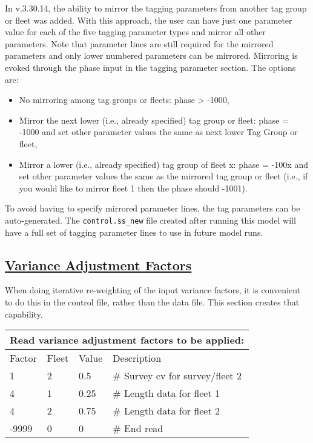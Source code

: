 In v.3.30.14, the ability to mirror the tagging parameters from another tag group or fleet was added. With this approach, the user can have just one parameter value for each of the five tagging parameter types and mirror all other parameters. Note that parameter lines are still required for the mirrored parameters and only lower numbered parameters can be mirrored. Mirroring is evoked through the phase input in the tagging parameter section. The options are:
\begin{itemize}
	\item No mirroring among tag groups or fleets: phase > -1000,
	\item Mirror the next lower (i.e., already specified) tag group or fleet: phase = -1000 and set other parameter values the same as next lower Tag Group or fleet,
	\item Mirror a lower (i.e., already specified) tag group of fleet x: phase = -100x and set other parameter values the same as the mirrored tag group or fleet (i.e., if you would like to mirror fleet 1 then the phase should -1001).
\end{itemize}

To avoid having to specify mirrored parameter lines, the tag parameters can be auto-generated. The \texttt{control.ss\_new} file created after running this model will have a full set of tagging parameter lines to use in future model runs.

\hypertarget{GcompVar}{}
\subsection[Variance Adjustment Factors]{\protect\hyperlink{GcompVar}{Variance Adjustment Factors}}
When doing iterative re-weighting of the input variance factors, it is convenient to do this in the control file, rather than the data file. This section creates that capability.

\begin{longtable}{p{3cm} p{3cm} p{2.5cm} p{6.25cm}}

	\multicolumn{4}{l}{Read variance adjustment factors to be applied:} \\
	\hline
	Factor & Fleet & Value & Description \Tstrut\Bstrut\\
	\hline
	1 & 2 & 0.5 & \# Survey \gls{cv} for survey/fleet 2 \Tstrut\\
	4 & 1 & 0.25 & \# Length data for fleet 1 \\
	4 & 2 & 0.75 & \# Length data for fleet 2 \\
	-9999 & 0 & 0 & \# End read \Bstrut\\
	\hline
\end{longtable}


